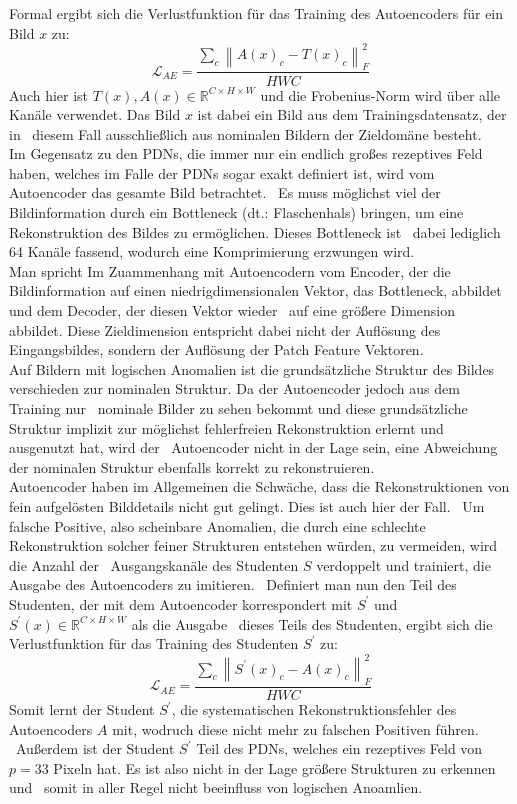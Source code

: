 Formal ergibt sich die Verlustfunktion für das Training des Autoencoders für ein Bild $x$ zu: \
$$
\mathcal{L}_{AE} = \frac{\sum_{c}\left\lVert A(x)_{c}-T(x)_{c} \right\rVert_{F}^{2}}{HWC}
$$
Auch hier ist $T(x), A(x) \in \mathbb{R}^{C \times H \times W}$ und die Frobenius-Norm wird über alle Kanäle verwendet. Das Bild $x$ ist dabei ein Bild aus dem Trainingsdatensatz, der in \
diesem Fall ausschließlich aus nominalen Bildern der Zieldomäne besteht. \\
Im Gegensatz zu den PDNs, die immer nur ein endlich großes rezeptives Feld haben, welches im Falle der PDNs sogar exakt definiert ist, wird vom Autoencoder das gesamte Bild betrachtet. \
Es muss möglichst viel der Bildinformation durch ein \glqq Bottleneck\grqq{} (dt.: Flaschenhals) bringen, um eine Rekonstruktion des Bildes zu ermöglichen. Dieses Bottleneck ist \
dabei lediglich 64 Kanäle fassend, wodurch eine Komprimierung erzwungen wird. \\
Man spricht Im Zuammenhang mit Autoencodern vom Encoder, der die Bildinformation auf einen niedrigdimensionalen Vektor, das Bottleneck, abbildet und dem Decoder, der diesen Vektor wieder \ 
auf eine größere Dimension abbildet. Diese Zieldimension entspricht dabei nicht der Auflösung des Eingangsbildes, sondern der Auflösung der Patch Feature Vektoren. \\
Auf Bildern mit logischen Anomalien ist die grundsätzliche Struktur des Bildes verschieden zur nominalen Struktur. Da der Autoencoder jedoch aus dem Training nur \
nominale Bilder zu sehen bekommt und diese grundsätzliche Struktur implizit zur möglichst fehlerfreien Rekonstruktion erlernt und ausgenutzt hat, wird der \
Autoencoder nicht in der Lage sein, eine Abweichung der nominalen Struktur ebenfalls korrekt zu rekonstruieren. \\
Autoencoder haben im Allgemeinen die Schwäche, dass die Rekonstruktionen von fein aufgelösten Bilddetails nicht gut gelingt. Dies ist auch hier der Fall. \
Um falsche Positive, also scheinbare Anomalien, die durch eine schlechte Rekonstruktion solcher feiner Strukturen entstehen würden, zu vermeiden, wird die Anzahl der \
Ausgangskanäle des Studenten $S$ verdoppelt und trainiert, die Ausgabe des Autoencoders zu imitieren. \
Definiert man nun den Teil des Studenten, der mit dem Autoencoder korrespondert mit $S^{\prime}$ und $S^{\prime}(x) \in \mathbb{R}^{C \times H \times W}$ als die Ausgabe \
dieses Teils des Studenten, ergibt sich die Verlustfunktion für das Training des Studenten $S^{\prime}$ zu:  \
$$
\mathcal{L}_{AE} = \frac{\sum_{c}\left\lVert S^{\prime}(x)_{c}-A(x)_{c} \right\rVert_{F}^{2}}{HWC}
$$
Somit lernt der Student $S^{\prime}$, die systematischen Rekonstruktionsfehler des Autoencoders $A$ mit, wodruch diese nicht mehr zu falschen Positiven führen. \
Außerdem ist der Student $S^{\prime}$ Teil des PDNs, welches ein rezeptives Feld von $p=33$ Pixeln hat. Es ist also nicht in der Lage größere Strukturen zu erkennen und \
somit in aller Regel nicht beeinfluss von logischen Anoamlien. \\
